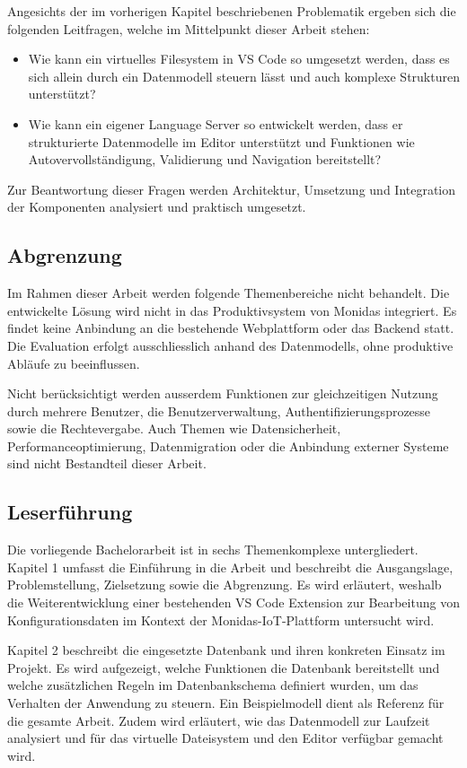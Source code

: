 Angesichts der im vorherigen Kapitel beschriebenen Problematik ergeben sich die folgenden Leitfragen, welche im Mittelpunkt dieser Arbeit stehen:

\begin{itemize}

\item Wie kann ein virtuelles Filesystem in VS Code so umgesetzt werden, dass es sich allein durch ein  Datenmodell steuern lässt und auch komplexe Strukturen unterstützt?

\item Wie kann ein eigener Language Server so entwickelt werden, dass er strukturierte Datenmodelle im Editor unterstützt und Funktionen wie Autovervollständigung, Validierung und Navigation bereitstellt?
\end{itemize}

Zur Beantwortung dieser Fragen werden Architektur, Umsetzung und Integration der Komponenten analysiert und praktisch umgesetzt.

\subsection{Abgrenzung}
Im Rahmen dieser Arbeit werden folgende Themenbereiche nicht behandelt. Die entwickelte Lösung wird nicht in das Produktivsystem von Monidas integriert. Es findet keine Anbindung an die bestehende Webplattform oder das Backend statt. Die Evaluation erfolgt ausschliesslich anhand des Datenmodells, ohne produktive Abläufe zu beeinflussen.

Nicht berücksichtigt werden ausserdem Funktionen zur gleichzeitigen Nutzung durch mehrere Benutzer, die Benutzerverwaltung, Authentifizierungsprozesse sowie die Rechtevergabe. Auch Themen wie Datensicherheit, Performanceoptimierung, Datenmigration oder die Anbindung externer Systeme sind nicht Bestandteil dieser Arbeit.


\subsection{Leserführung}

Die vorliegende Bachelorarbeit ist in sechs Themenkomplexe untergliedert. Kapitel 1 umfasst die Einführung in die Arbeit und beschreibt die Ausgangslage, Problemstellung, Zielsetzung sowie die Abgrenzung. Es wird erläutert, weshalb die Weiterentwicklung einer bestehenden VS Code Extension zur Bearbeitung von Konfigurationsdaten im Kontext der Monidas-IoT-Plattform untersucht wird.

Kapitel 2 beschreibt die eingesetzte Datenbank und ihren konkreten Einsatz im Projekt. Es wird aufgezeigt, welche Funktionen die Datenbank bereitstellt und welche zusätzlichen Regeln im Datenbankschema definiert wurden, um das Verhalten der Anwendung zu steuern. Ein Beispielmodell dient als Referenz für die gesamte Arbeit. Zudem wird erläutert, wie das Datenmodell zur Laufzeit analysiert und für das virtuelle Dateisystem und den Editor verfügbar gemacht wird.
